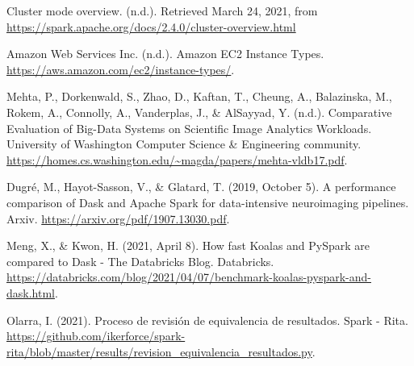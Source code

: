 \documentclass[11pt, oneside]{book}
\begin{document}
\begin{thebibliography}{111}
 Cluster mode overview. (n.d.). Retrieved March 24, 2021, from \url{https://spark.apache.org/docs/2.4.0/cluster-overview.html}


 Amazon Web Services Inc. (n.d.). Amazon EC2 Instance Types.  \url{https://aws.amazon.com/ec2/instance-types/}.

 Mehta, P., Dorkenwald, S., Zhao, D., Kaftan, T., Cheung, A., Balazinska, M., Rokem, A., Connolly, A., Vanderplas, J.,  \& AlSayyad, Y. (n.d.). Comparative Evaluation of Big-Data Systems on Scientific Image Analytics Workloads. University of Washington Computer Science \& Engineering community. \url{https://homes.cs.washington.edu/~magda/papers/mehta-vldb17.pdf}. 

 Dugré, M., Hayot-Sasson, V., \& Glatard, T. (2019, October 5). A performance comparison of Dask and Apache Spark for data-intensive neuroimaging pipelines. Arxiv. \url{https://arxiv.org/pdf/1907.13030.pdf}.

 Meng, X., \& Kwon, H. (2021, April 8). How fast Koalas and PySpark are compared to Dask - The Databricks Blog. Databricks. \url{https://databricks.com/blog/2021/04/07/benchmark-koalas-pyspark-and-dask.html}. 

 Olarra, I. (2021). Proceso de revisión de equivalencia de resultados. Spark - Rita. \url{https://github.com/ikerforce/spark-rita/blob/master/results/revision_equivalencia_resultados.py}. 



























\end{thebibliography}
\end{document}
